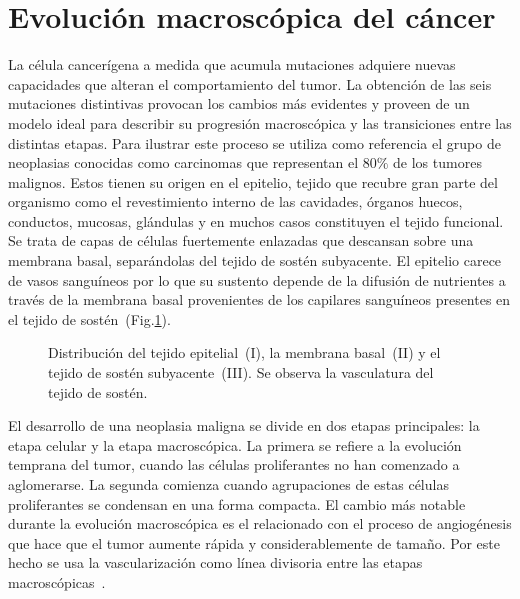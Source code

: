 \section{Evoluci\'on macrosc\'opica del c\'ancer}
\label{subsec-macro}
La c\'elula cancer\'igena a medida que acumula mutaciones adquiere nuevas capacidades que alteran el comportamiento del tumor. La obtenci\'on de las seis mutaciones distintivas provocan los cambios m\'as evidentes y proveen de un modelo ideal para describir su progresi\'on macrosc\'opica y las transiciones entre las distintas etapas. Para ilustrar este proceso se utiliza como referencia el grupo de neoplasias conocidas como carcinomas que representan el $80\%$ de los tumores malignos. Estos tienen su origen en el epitelio, tejido que recubre gran parte del organismo como el revestimiento interno de las cavidades, \'organos huecos, conductos, mucosas, gl\'andulas y en muchos casos constituyen el tejido funcional. Se trata de capas de c\'elulas fuertemente enlazadas que descansan sobre una membrana basal, separ\'andolas del tejido de sost\'en subyacente. El epitelio carece de vasos sangu\'ineos por lo que su sustento depende de la difusi\'on de nutrientes a trav\'es de la membrana basal provenientes de los capilares sangu\'ineos presentes en el tejido de sost\'en~(Fig.\ref{fig-epitelium}).

\begin{figure}[!ht]
\begin{center}
\end{center}\vspace*{-0.6cm}
\caption[Distribuci\'on del tejido epitelial, la membrana basal y el tejido de sost\'en subyacente]{Distribuci\'on del tejido epitelial~(I), la membrana basal~(II) y el tejido de sost\'en subyacente~(III). Se observa la vasculatura del tejido de sost\'en.}
\label{fig-epitelium}
\end{figure}

El desarrollo de una neoplasia maligna se divide en dos etapas principales: la etapa celular y la etapa macrosc\'opica. La primera se refiere a la evoluci\'on temprana del tumor, cuando las c\'elulas proliferantes no han comenzado a aglomerarse. La segunda comienza cuando agrupaciones de estas c\'elulas proliferantes se condensan en una forma compacta. El cambio m\'as notable durante la evoluci\'on macrosc\'opica es el relacionado con el proceso de angiog\'enesis que hace que el tumor aumente r\'apida y considerablemente de tama\~no. Por este hecho se usa la vascularizaci\'on como l\'inea divisoria entre las etapas macrosc\'opicas~\cite{vascular}. 

